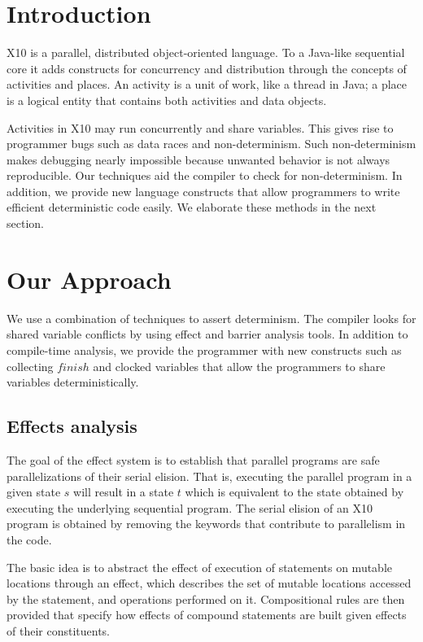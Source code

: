 \documentclass[preprint]{sigplanconf}
\begin{document}



\section{Introduction}
X10 is a parallel, distributed object-oriented language. To a Java-like sequential core 
it adds constructs for concurrency and distribution through the
concepts of activities and places.  
An activity is a unit of work, like a thread in
Java; a place is a logical entity that contains both activities and data objects.

Activities in X10 may run concurrently and share variables. This gives
rise to programmer bugs such as data races and non-determinism.
Such non-determinism makes debugging nearly impossible because unwanted
behavior is not always reproducible.
Our techniques aid the compiler to check for non-determinism. 
In addition, we provide new language constructs that allow programmers
to write efficient deterministic code easily. We elaborate these methods
in the next section.

\section{Our Approach}
We use a combination of techniques to assert determinism. The compiler looks for shared variable
conflicts by using effect and barrier analysis tools. In addition to compile-time
analysis, we  provide the programmer with new constructs
such as collecting $finish$ and clocked variables
that allow the programmers to share variables deterministically.  

\subsection{Effects analysis}
The goal of the effect system is to establish that parallel programs are safe
parallelizations of their serial elision. 
That is, executing the parallel program in
a given state $s$ will result in a state $t$ which is equivalent to the state obtained
by executing the underlying sequential program.
The serial elision of an X10 program is obtained
by removing the keywords that contribute to parallelism in the code.

The basic idea is to abstract the effect of execution of statements on mutable
locations through an effect, which describes the set of mutable locations accessed
by the statement, and operations performed on it. Compositional rules are then
provided that specify how effects of compound statements are built given effects
of their constituents.
\end{document}
